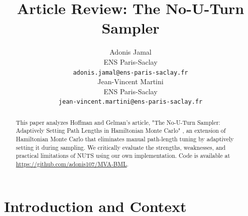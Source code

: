 \documentclass{article}
\title{Article Review: The No-U-Turn Sampler}
\author{%
  Adonis Jamal \\
  ENS Paris-Saclay \\
  \texttt{\small adonis.jamal@ens-paris-saclay.fr}\\
  \And
  Jean-Vincent Martini \\ 
  ENS Paris-Saclay \\
  \texttt{\small jean-vincent.martini@ens-paris-saclay.fr} \\
}
\begin{document}
\maketitle


\begin{abstract}
  This paper analyzes Hoffman and Gelman's article, "The No-U-Turn Sampler: Adaptively Setting Path Lengths in Hamiltonian Monte Carlo" \cite{main}, an extension of Hamiltonian Monte Carlo that eliminates manual path-length tuning by adaptively setting it during sampling. We critically evaluate the strengths, weaknesses, and practical limitations of NUTS using our own implementation. Code is available at \url{https://github.com/adonis107/MVA-BML}.
\end{abstract}

\vspace*{-1cm}

\section{Introduction and Context}
\end{document}
